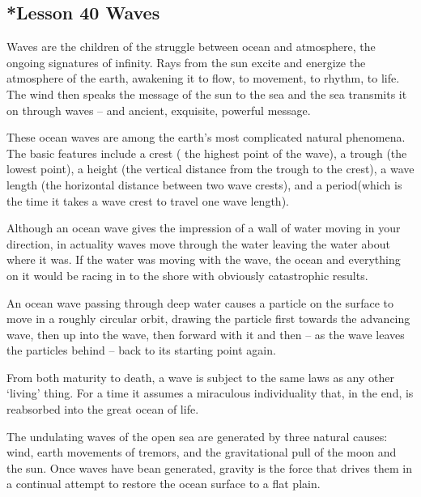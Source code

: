 \documentclass[kindlepaper]{BHCexam4kindle}
\begin{document}
\subsection{*Lesson 40 
Waves}
\par
Waves are the children of the struggle between ocean and atmosphere, the ongoing signatures of infinity. Rays
from the sun excite and energize the atmosphere of the earth, awakening it to flow, to movement, to rhythm, to
life. The wind then speaks the message of the sun to the sea and the sea transmits it on through waves – and
ancient, exquisite, powerful message.
\par
These ocean waves are among the earth's most complicated natural phenomena. The basic features
include a crest ( the highest point of the wave), a trough (the lowest point), a height (the vertical distance from
the trough to the crest), a wave length (the horizontal distance between two wave crests), and a period(which is
the time it takes a wave crest to travel one wave length).
\par
Although an ocean wave gives the impression of a wall of water moving in your direction, in actuality
waves move through the water leaving the water about where it was. If the water was moving with the wave,
the ocean and everything on it would be racing in to the shore with obviously catastrophic results.
\par
An ocean wave passing through deep water causes a particle on the surface to move in a roughly circular
orbit, drawing the particle first towards the advancing wave, then up into the wave, then forward with it and
then – as the wave leaves the particles behind – back to its starting point again.
\par
From both maturity to death, a wave is subject to the same laws as any other ‘living' thing. For a time it
assumes a miraculous individuality that, in the end, is reabsorbed into the great ocean of life.
\par
The undulating waves of the open sea are generated by three natural causes: wind, earth movements of
tremors, and the gravitational pull of the moon and the sun. Once waves have bean generated, gravity is the
force that drives them in a continual attempt to restore the ocean surface to a flat plain.
\clearpage
\end{document}
